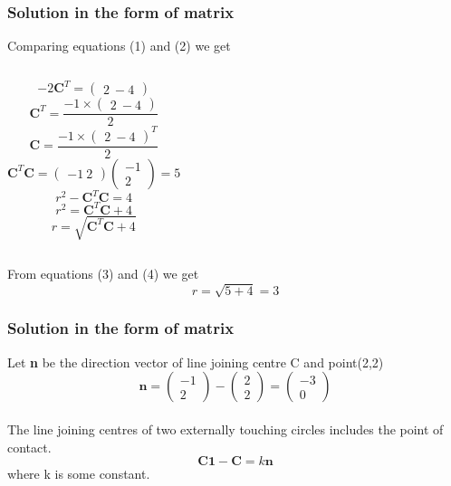 \documentclass{beamer}
\begin{document}
\begin{frame}
\frametitle{Solution in the form of matrix}
Comparing equations (1) and (2) we get
\begin{columns}
$$ -2\textbf{C}^T = \begin{pmatrix}2\ -4 \end{pmatrix}$$
$$ \textbf{C}^T = \frac{-1\times \begin{pmatrix}2\ -4 \end{pmatrix}}{2} $$
 $$\textbf{C} = \frac{-1\times \begin{pmatrix}2\ -4 \end{pmatrix}^T}{2} $$
\begin{equation}
\textbf{C}^T\textbf{C} = \begin{pmatrix}-1\ 2 \end{pmatrix} \begin{pmatrix}-1\\ 2 \end{pmatrix}  = 5
\end{equation}
$$r^2-\textbf{C}^T\textbf{C} = 4 $$
$$r^2 = \textbf{C}^T\textbf{C} + 4 $$
\begin{equation}
 r = \sqrt{\textbf{C}^T\textbf{C} + 4} 
\end{equation}
\end{columns}
From equations (3) and (4) we get 
$$ r = \sqrt{ 5 + 4 } = 3 $$
\end{frame}

\begin{frame}
\frametitle{Solution in the form of matrix}
Let \textbf{n} be the direction vector of line joining centre C and point(2,2)$$\textbf{n} = \begin{pmatrix}-1\\ 2 \end{pmatrix} - \begin{pmatrix}2\\ 2 \end{pmatrix} = \begin{pmatrix}-3\\ 0 \end{pmatrix}$$\\
The line joining centres of two externally touching circles includes the point of contact.$$\textbf{C1} - \textbf{C} = k\textbf{n} $$ where k is some constant.
\end{frame}
\end{document}

